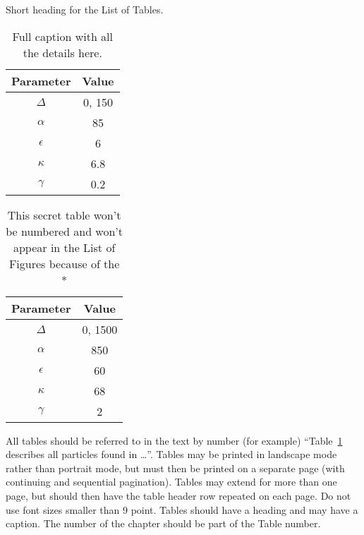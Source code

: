 \begin{table}
\center%
\caption{Short heading for the List of Tables.}
\begin{tabular}{c c}
Parameter & Value \\ \midrule \midrule
$\Delta$ & 0, 150 \\
${\alpha}$ & 85 \\
${\epsilon}$ & 6 \\
${\kappa}$ & 6.8 \\
${\gamma}$ & 0.2
\end{tabular}\label{tab:1}
\caption*{Full caption with all the details here.}
\end{table}

\begin{table} \center%
\begin{tabular}{c c}
Parameter & Value \\ \midrule \midrule
$\Delta$ & 0, 1500 \\
${\alpha}$ & 850 \\
${\epsilon}$ & 60 \\
${\kappa}$ & 68 \\
${\gamma}$ & 2
\end{tabular}\label{tab:2}
\caption*{This secret table won't be numbered and won't appear in the List of Figures because of the * }
\end{table}

All tables should be referred to in the text by number (for example) “Table~\ref{tab:1} describes all particles found in \ldots''.
Tables may be printed in landscape mode rather than portrait mode, but must then be printed on a separate page (with continuing and sequential pagination).
Tables may extend for more than one page, but should then have the table header row repeated on each page.
Do not use font sizes smaller than 9 point.
Tables should have a heading and may have a caption.
The number of the chapter should be part of the Table number.